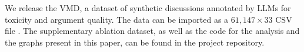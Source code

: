 %

We release the \ac{VMD}, a dataset of synthetic discussions annotated by \acp{LLM} for toxicity and argument quality. The data can be imported as a $61,147 \times 33$ CSV file \datasetlink. The supplementary ablation dataset, as well as the code for the analysis and the graphs present in this paper, can be found in the project repository\analysislink.